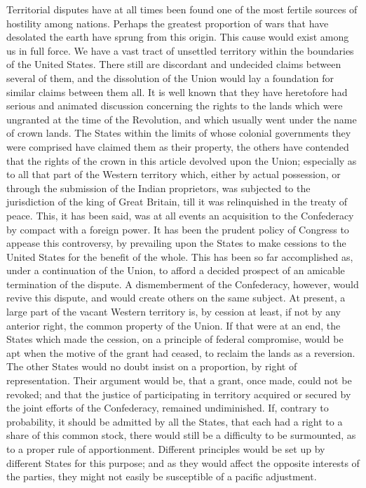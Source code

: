 Territorial disputes have at all times been found one of the most fertile sources of hostility among nations. 
Perhaps the greatest proportion of wars that have desolated the earth have sprung from this origin. 
This cause would exist among us in full force. 
We have a vast tract of unsettled territory within the boundaries of the United States. 
There still are discordant and undecided claims between several of them, and the dissolution of the Union would lay a foundation for similar claims between them all. 
It is well known that they have heretofore had serious and animated discussion concerning the rights to the lands which were ungranted at the time of the Revolution, and which usually went under the name of crown lands. 
The States within the limits of whose colonial governments they were comprised have claimed them as their property, the others have contended that the rights of the crown in this article devolved upon the Union; especially as to all that part of the Western territory which, either by actual possession, or through the submission of the Indian proprietors, was subjected to the jurisdiction of the king of Great Britain, till it was relinquished in the treaty of peace. 
This, it has been said, was at all events an acquisition to the Confederacy by compact with a foreign power. 
It has been the prudent policy of Congress to appease this controversy, by prevailing upon the States to make cessions to the United States for the benefit of the whole. 
This has been so far accomplished as, under a continuation of the Union, to afford a decided prospect of an amicable termination of the dispute. 
A dismemberment of the Confederacy, however, would revive this dispute, and would create others on the same subject. 
At present, a large part of the vacant Western territory is, by cession at least, if not by any anterior right, the common property of the Union. 
If that were at an end, the States which made the cession, on a principle of federal compromise, would be apt when the motive of the grant had ceased, to reclaim the lands as a reversion. 
The other States would no doubt insist on a proportion, by right of representation. 
Their argument would be, that a grant, once made, could not be revoked; and that the justice of participating in territory acquired or secured by the joint efforts of the Confederacy, remained undiminished. 
If, contrary to probability, it should be admitted by all the States, that each had a right to a share of this common stock, there would still be a difficulty to be surmounted, as to a proper rule of apportionment. 
Different principles would be set up by different States for this purpose; and as they would affect the opposite interests of the parties, they might not easily be susceptible of a pacific adjustment.

